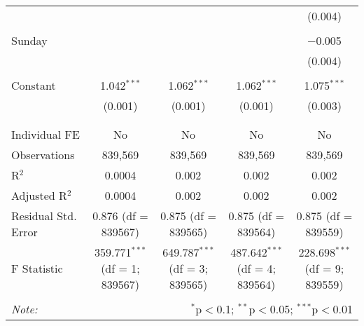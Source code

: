 \documentclass[
]{article}
\begin{document}
\begin{table}[!htbp]
{\begin{tabular}{@{\extracolsep{5pt}}lcccc}
  &  &  &  & (0.004) \\ 
  & & & & \\ 
 Sunday &  &  &  & $-$0.005 \\ 
  &  &  &  & (0.004) \\ 
  & & & & \\ 
 Constant & 1.042$^{***}$ & 1.062$^{***}$ & 1.062$^{***}$ & 1.075$^{***}$ \\ 
  & (0.001) & (0.001) & (0.001) & (0.003) \\ 
  & & & & \\ 
\hline \\[-1.8ex] 
Individual FE & No & No & No & No \\ 
Observations & 839,569 & 839,569 & 839,569 & 839,569 \\ 
R$^{2}$ & 0.0004 & 0.002 & 0.002 & 0.002 \\ 
Adjusted R$^{2}$ & 0.0004 & 0.002 & 0.002 & 0.002 \\ 
Residual Std. Error & 0.876 (df = 839567) & 0.875 (df = 839565) & 0.875 (df = 839564) & 0.875 (df = 839559) \\ 
F Statistic & 359.771$^{***}$ (df = 1; 839567) & 649.787$^{***}$ (df = 3; 839565) & 487.642$^{***}$ (df = 4; 839564) & 228.698$^{***}$ (df = 9; 839559) \\ 
\hline 
\hline \\[-1.8ex] 
\textit{Note:}  & \multicolumn{4}{r}{$^{*}$p$<$0.1; $^{**}$p$<$0.05; $^{***}$p$<$0.01} \\ 
\end{tabular}
} 
\end{table} 
\newpage
\end{document}

